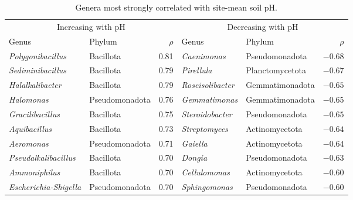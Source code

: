 \begin{table}[htbp]
\centering\scriptsize
\caption{Genera most strongly correlated with site-mean soil pH.}
\label{tab:ph_genera}
\begin{tabular}{llrllr}
\toprule
\multicolumn{3}{c}{Increasing with pH} & \multicolumn{3}{c}{Decreasing with pH} \\
\cmidrule(lr){1-3}\cmidrule(lr){4-6}
Genus & Phylum & $\rho$ & Genus & Phylum & $\rho$ \\
\midrule
\textit{Polygonibacillus}     & Bacillota & 0.81 & \textit{Caenimonas}      & Pseudomonadota & $-0.68$ \\
\textit{Sediminibacillus}     & Bacillota & 0.79 & \textit{Pirellula}       & Planctomycetota & $-0.67$ \\
\textit{Halalkalibacter}      & Bacillota & 0.79 & \textit{Roseisolibacter} & Gemmatimonadota & $-0.65$ \\
\textit{Halomonas}            & Pseudomonadota & 0.76 & \textit{Gemmatimonas}    & Gemmatimonadota & $-0.65$ \\
\textit{Gracilibacillus}      & Bacillota & 0.75 & \textit{Steroidobacter}  & Pseudomonadota & $-0.65$ \\
\textit{Aquibacillus}         & Bacillota & 0.73 & \textit{Streptomyces}    & Actinomycetota & $-0.64$ \\
\textit{Aeromonas}            & Pseudomonadota & 0.71 & \textit{Gaiella}         & Actinomycetota & $-0.64$ \\
\textit{Pseudalkalibacillus}  & Bacillota & 0.70 & \textit{Dongia}          & Pseudomonadota & $-0.63$ \\
\textit{Ammoniphilus}         & Bacillota & 0.70 & \textit{Cellulomonas}    & Actinomycetota & $-0.60$ \\
\textit{Escherichia-Shigella} & Pseudomonadota & 0.70 & \textit{Sphingomonas}    & Pseudomonadota & $-0.60$ \\
\bottomrule
\end{tabular}
\end{table}